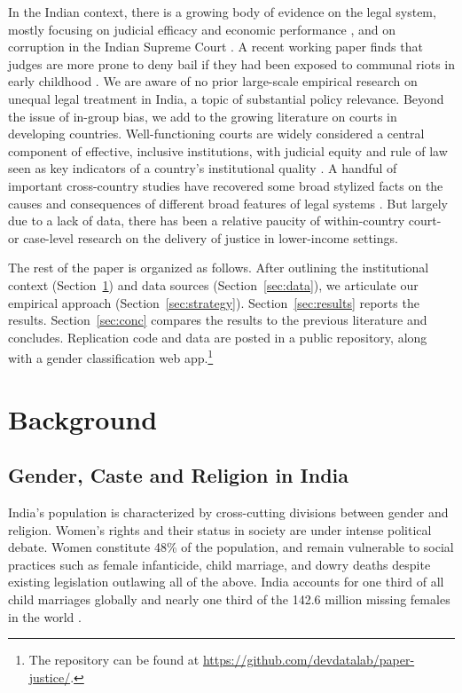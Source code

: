 \documentclass[12pt,english]{article}
\begin{document}
In the Indian context, there is a growing body of evidence on the legal system, mostly focusing on judicial efficacy and economic performance \citep{Chemin2009JoCE,rao2019judges}, and on corruption in the Indian Supreme Court \citep{aney2017jobs}. A recent working paper finds that judges are more prone to deny bail if they had been exposed to communal riots in early childhood \citep{bhartiroy2020}. We are aware of no prior large-scale empirical research on unequal legal treatment in India, a topic of substantial policy relevance.
Beyond the issue of in-group bias, we add to the growing literature on courts in developing countries. Well-functioning courts are widely considered a central component of effective, inclusive institutions, with judicial equity and rule of law seen as key indicators of a country’s institutional quality \citep{Rodrik2000Sicid,Le2004JoID,Rodrik2005Hoeg,pande2005institutions,Visaria2009AEJAE,lichand2014access,PonticelliAlencar2016TQJoE,world2017world}. A handful of important cross-country studies have recovered some broad stylized facts on the causes and consequences of different broad features of legal systems \citep{DjankovLaPortaLopez-de-SilanesShleifer2003QJoE,la2004judicial,LaPortaLopez-de-SilanesShleifer2008JoEL}. But largely due to a lack of data, there has been a relative paucity of within-country court- or case-level research on the delivery of justice in lower-income settings. 

The rest of the paper is organized as follows. After outlining the institutional context (Section~\ref{sec:bg}) and data sources (Section~\ref{sec:data}), we articulate our empirical approach (Section~\ref{sec:strategy}). Section~\ref{sec:results} reports the results. Section~\ref{sec:conc} compares the results to the previous literature and concludes. Replication code and data are posted in a public repository, along with a gender classification web app.\footnote{The repository can be found at \url{https://github.com/devdatalab/paper-justice/}.} 

\section{Background}
\label{sec:bg}

\subsection{Gender, Caste and Religion in India}

India's population is characterized by cross-cutting divisions between gender and religion. Women's rights and their status in society are under intense political debate. Women constitute 48\% of the population, and remain vulnerable to social practices such as female infanticide, child marriage, and dowry deaths despite existing legislation outlawing all of the above. India accounts for one third of all child marriages globally \citep{cousins2020} and nearly one third of the 142.6 million missing females in the world \citep{Erken2020}. 
\end{document}
